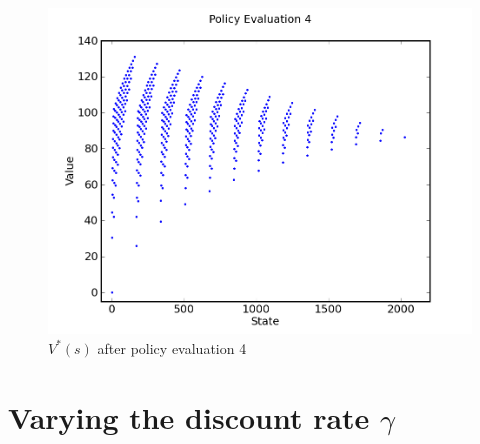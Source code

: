 \documentclass[a4paper]{article}
\begin{document}
\begin{figure}[h]
\center
\includegraphics[scale=0.75]{policy_iteration/evaluation_4.png}
\caption{$V^*(s)$ after policy evaluation 4}
\end{figure}


\newpage
\section{Varying the discount rate $\gamma$}
\end{document}
